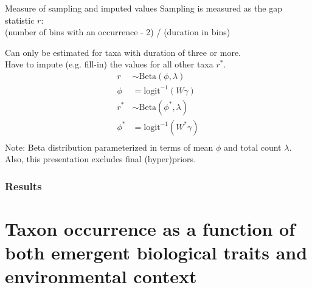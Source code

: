 \documentclass{beamer}
\begin{document}
\begin{frame}
  \begin{block}{Measure of sampling and imputed values}
    Sampling is measured as the gap statistic \(r\): \\(number of bins with an occurrence - 2) / (duration in bins)

    Can only be estimated for taxa with duration of three or more. \\Have to impute (e.g. fill-in) the values for all other taxa \(r^{\ast}\).
    \begin{align*}
      r &\sim \text{Beta}(\phi, \lambda) \\
      \phi &= \text{logit}^{-1}(W\gamma) \\
      r^{\ast} &\sim \text{Beta}(\phi^{\ast}, \lambda) \\
      \phi^{\ast} &= \text{logit}^{-1}(W^{\ast}\gamma) \\
    \end{align*}
    \scriptsize{Note: Beta distribution parameterized in terms of mean \(\phi\) and total count \(\lambda\). Also, this presentation excludes final (hyper)priors.}
  \end{block}

\end{frame}

\begin{frame}
  \frametitle{Results}
\end{frame}

\section{Taxon occurrence as a function of both emergent biological traits and environmental context}
\end{document}
